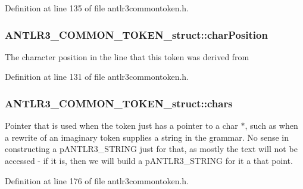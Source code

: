 Definition at line 135 of file antlr3commontoken.\-h.

\hypertarget{struct_a_n_t_l_r3___c_o_m_m_o_n___t_o_k_e_n__struct_acac91fe953476fe8e439db81194f8195}{
\subsubsection[{char\-Position}]{ A\-N\-T\-L\-R3\-\_\-\-C\-O\-M\-M\-O\-N\-\_\-\-T\-O\-K\-E\-N\-\_\-struct\-::char\-Position}}\label{struct_a_n_t_l_r3___c_o_m_m_o_n___t_o_k_e_n__struct_acac91fe953476fe8e439db81194f8195}
The character position in the line that this token was derived from 

Definition at line 131 of file antlr3commontoken.\-h.

\hypertarget{struct_a_n_t_l_r3___c_o_m_m_o_n___t_o_k_e_n__struct_aeb34d4b24908b1fab2d7030e8d965c96}{
\subsubsection[{chars}]{ A\-N\-T\-L\-R3\-\_\-\-C\-O\-M\-M\-O\-N\-\_\-\-T\-O\-K\-E\-N\-\_\-struct\-::chars}}\label{struct_a_n_t_l_r3___c_o_m_m_o_n___t_o_k_e_n__struct_aeb34d4b24908b1fab2d7030e8d965c96}
Pointer that is used when the token just has a pointer to a char $\ast$, such as when a rewrite of an imaginary token supplies a string in the grammar. No sense in constructing a p\-A\-N\-T\-L\-R3\-\_\-\-S\-T\-R\-I\-N\-G just for that, as mostly the text will not be accessed -\/ if it is, then we will build a p\-A\-N\-T\-L\-R3\-\_\-\-S\-T\-R\-I\-N\-G for it a that point. 

Definition at line 176 of file antlr3commontoken.\-h.

